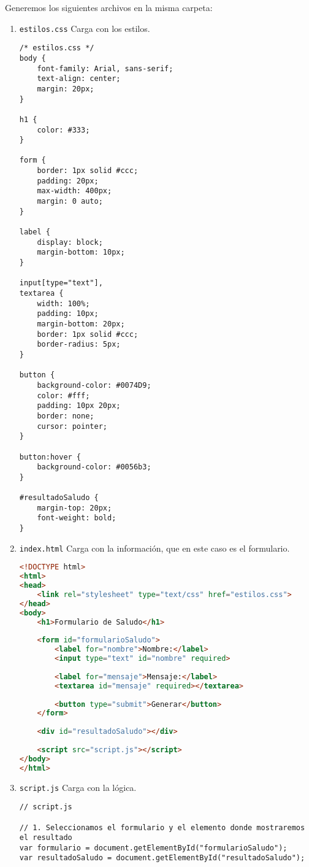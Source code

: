 \documentclass[executivepaper]{article}
\begin{document}
Generemos los siguientes archivos en la misma carpeta:
  \begin{enumerate}
    \item \texttt{estilos.css} Carga con los estilos.
\begin{lstlisting}
/* estilos.css */
body {
    font-family: Arial, sans-serif;
    text-align: center;
    margin: 20px;
}

h1 {
    color: #333;
}

form {
    border: 1px solid #ccc;
    padding: 20px;
    max-width: 400px;
    margin: 0 auto;
}

label {
    display: block;
    margin-bottom: 10px;
}

input[type="text"],
textarea {
    width: 100%;
    padding: 10px;
    margin-bottom: 20px;
    border: 1px solid #ccc;
    border-radius: 5px;
}

button {
    background-color: #0074D9;
    color: #fff;
    padding: 10px 20px;
    border: none;
    cursor: pointer;
}

button:hover {
    background-color: #0056b3;
}

#resultadoSaludo {
    margin-top: 20px;
    font-weight: bold;
}
\end{lstlisting}
    \item \texttt{index.html} Carga con la información, que en este caso es el formulario.
\begin{lstlisting}[language=HTML]
<!DOCTYPE html>
<html>
<head>
    <link rel="stylesheet" type="text/css" href="estilos.css">
</head>
<body>
    <h1>Formulario de Saludo</h1>
    
    <form id="formularioSaludo">
        <label for="nombre">Nombre:</label>
        <input type="text" id="nombre" required>
        
        <label for="mensaje">Mensaje:</label>
        <textarea id="mensaje" required></textarea>
        
        <button type="submit">Generar</button>
    </form>
    
    <div id="resultadoSaludo"></div>
    
    <script src="script.js"></script>
</body>
</html>  
\end{lstlisting}
    \item \texttt{script.js} Carga con la lógica.
\begin{lstlisting}
// script.js

// 1. Seleccionamos el formulario y el elemento donde mostraremos el resultado
var formulario = document.getElementById("formularioSaludo");
var resultadoSaludo = document.getElementById("resultadoSaludo");


\end{lstlisting}
\end{enumerate}
\end{document}
